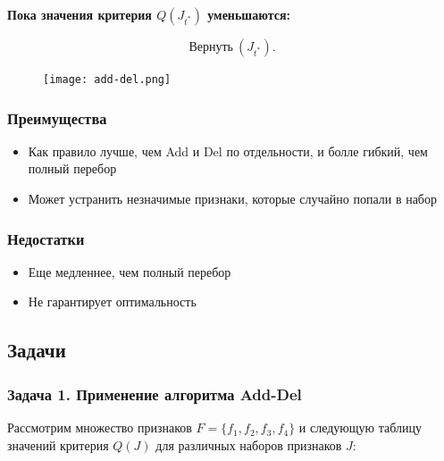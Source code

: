 \textbf{Пока значения критерия \( Q(J_{t^*}) \) уменьшаются:}

\[ \text{Вернуть} \ ( J_{t^*} ).\]


\begin{figure}[h!!!!!!!!!!]
	\centering
	\texttt{[image: add-del.png]}
\end{figure}



\subsubsection*{Преимущества}

\begin{itemize}

    \item Как правило лучше, чем Add и Del по отдельности, и болле гибкий, чем полный перебор

    \item Может устранить незначимые признаки, которые случайно попали в набор
    
\end{itemize}

\subsubsection*{Недостатки}

\begin{itemize}

    \item Еще медленнее, чем полный перебор

    \item Не гарантирует оптимальность
    
\end{itemize}



\bigskip
\bigskip




\subsection*{Задачи}



\subsubsection*{Задача 1. Применение алгоритма Add-Del}

Рассмотрим множество признаков \( F = \{f_1, f_2, f_3, f_4\} \) и следующую таблицу значений критерия \( Q(J) \) для различных наборов признаков \( J \):

